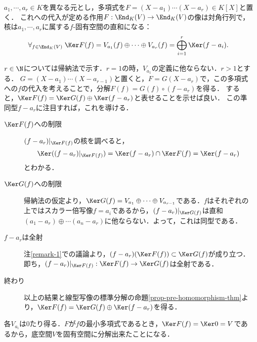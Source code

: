 \documentclass[uplatex, dvipdfmx]{jsreport}
\begin{document}
\begin{proposition}[重根を持たない多項式が定める自己準同型の核]\label{prop-diagonalization}
    $a_1,\cdots,a_r\in K$を異なる元とし，多項式を$F=(X-a_1)\cdots(X-a_r)\in K[X]$と置く．
    これへの代入が定める作用$F:\End_K(V)\to\End_K(V)$の像は対角行列で，核は$a_1,\cdots,a_r$に属する$f$-固有空間の直和になる：
    \[\forall_{f\in\End_K(V)}\;\Ker F(f)=V_{a_1}(f)\oplus\cdots\oplus V_{a_r}(f)=\bigoplus_{i=1}^r\Ker(f-a_i). \]
\end{proposition}
\begin{Proof}
    $r\in\N$については帰納法で示す．$r=1$の時，$V_{a_1}$の定義に他ならない．$r>1$とする．
    $G=(X-a_1)\cdots(X-a_{r-1})$と置くと，$F=G(X-a_r)$で，この多項式への$f$の代入を考えることで，分解$F(f)=G(f)\circ (f-a_r)$を得る．
    すると，$\Ker F(f)=\Ker G(f)\oplus\Ker(f-a_r)$と表せることを示せば良い．
    この準同型$f-a_r$に注目すれば，これを導ける．

    \begin{description}
        \item[$\Ker F(f)$への制限] $(f-a_r)|_{\Ker F(f)}$の核を調べると，
        \[\Ker((f-a_r)|_{\Ker F(f)})=\Ker(f-a_r)\cap\Ker F(f)=\Ker(f-a_r)\]
        とわかる．
        \item[$\Ker G(f)$への制限] 帰納法の仮定より，$\Ker G(f)=V_{a_1}\oplus\cdots\oplus V_{a_{r-1}}$である．$f$はそれぞれの上ではスカラー倍写像$f=a_i$であるから，$(f-a_r)|_{\Ker G(f)}$は直和$(a_1-a_r)\oplus\cdots(a_n-a_r)$に他ならない．よって，これは同型である．
        \item[$f-a_r$は全射] 注\ref{remark-1}での議論より，$(f-a_r)(\Ker F(f))\subset\Ker G(f)$が成り立つ．即ち，$(f-a_r)|_{\Ker F(f)}:\Ker F(f)\to\Ker G(f)$は全射である．
        \item[終わり] 以上の結果と線型写像の標準分解の命題\ref{prop-pre-homomorphism-thm}より，$\Ker F(f)=\Ker G(f)\oplus\Ker(f-a_r)$を得る．
    \end{description}
\end{Proof}
\begin{remarks}
    各$V_{a_i}$は$0$たり得る．$F$が$f$の最小多項式であるとき，$\Ker F(f)=\Ker 0=V$であるから，底空間$V$を固有空間に分解出来たことになる．
\end{remarks}
\end{document}
